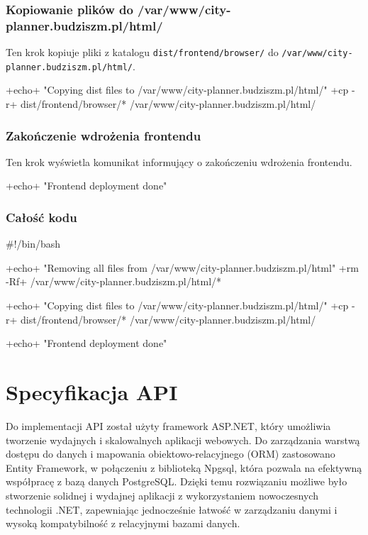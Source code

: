 \subsubsection{Kopiowanie plików do /var/www/city-planner.budziszm.pl/html/}
Ten krok kopiuje pliki z katalogu \texttt{dist/frontend/browser/} \newline
do \texttt{/var/www/city-planner.budziszm.pl/html/}.
\begin{longlisting}[style=shell-colored]
+echo+ "Copying dist files to /var/www/city-planner.budziszm.pl/html/"
+cp -r+ dist/frontend/browser/* /var/www/city-planner.budziszm.pl/html/
\end{longlisting}

\subsubsection{Zakończenie wdrożenia frontendu}
Ten krok wyświetla komunikat informujący o zakończeniu wdrożenia frontendu.
\begin{longlisting}[style=shell-colored]
+echo+ "Frontend deployment done"
\end{longlisting}

\subsubsection{Całość kodu}
\begin{longlisting}[style=shell-colored]
#!/bin/bash

+echo+ "Removing all files from /var/www/city-planner.budziszm.pl/html"
+rm -Rf+ /var/www/city-planner.budziszm.pl/html/*

+echo+ "Copying dist files to /var/www/city-planner.budziszm.pl/html/"
+cp -r+ dist/frontend/browser/* /var/www/city-planner.budziszm.pl/html/

+echo+ "Frontend deployment done"
\end{longlisting}

\section{Specyfikacja API}
Do implementacji API został użyty framework ASP.NET, który umożliwia tworzenie wydajnych i skalowalnych aplikacji webowych. Do zarządzania warstwą dostępu do danych i mapowania obiektowo-relacyjnego (ORM) zastosowano Entity Framework, w połączeniu z biblioteką Npgsql, która pozwala na efektywną współpracę z bazą danych PostgreSQL\@.
Dzięki temu rozwiązaniu możliwe było stworzenie solidnej i wydajnej aplikacji z wykorzystaniem nowoczesnych technologii .NET, zapewniając jednocześnie łatwość w zarządzaniu danymi i wysoką kompatybilność z relacyjnymi bazami danych.

